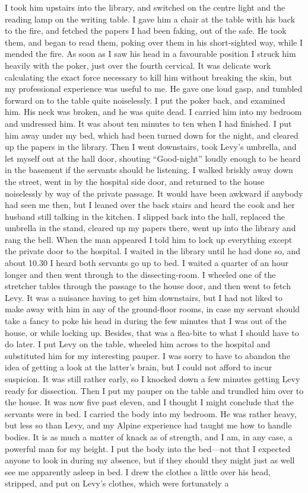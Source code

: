 I took him upstairs into the library, and switched on the centre light and the reading lamp on the writing table. I gave him a chair at the table with his back to the fire, and fetched the papers I had been faking, out of the safe. He took them, and began to read them, poking over them in his short-sighted way, while I mended the fire. As soon as I saw his head in a favourable position I struck him heavily with the poker, just over the fourth cervical. It was delicate work calculating the exact force necessary to kill him without breaking the skin, but my professional experience was useful to me. He gave one loud gasp, and tumbled forward on to the table quite noiselessly. I put the poker back, and examined him. His neck was broken, and he was quite dead. I carried him into my bedroom and undressed him. It was about ten minutes to ten when I had finished. I put him away under my bed, which had been turned down for the night, and cleared up the papers in the library. Then I went downstairs, took Levy’s umbrella, and let myself out at the hall door, shouting \enquote{Good-night} loudly enough to be heard in the basement if the servants should be listening. I walked briskly away down the street, went in by the hospital side door, and returned to the house noiselessly by way of the private passage. It would have been awkward if anybody had seen me then, but I leaned over the back stairs and heard the cook and her husband still talking in the kitchen. I slipped back into the hall, replaced the umbrella in the stand, cleared up my papers there, went up into the library and rang the bell. When the man appeared I told him to lock up everything except the private door to the hospital. I waited in the library until he had done so, and about 10.30 I heard both servants go up to bed. I waited a quarter of an hour longer and then went through to the dissecting-room. I wheeled one of the stretcher tables through the passage to the house door, and then went to fetch Levy. It was a nuisance having to get him downstairs, but I had not liked to make away with him in any of the ground-floor rooms, in case my servant should take a fancy to poke his head in during the few minutes that I was out of the house, or while locking up. Besides, that was a flea-bite to what I should have to do later. I put Levy on the table, wheeled him across to the hospital and substituted him for my interesting pauper. I was sorry to have to abandon the idea of getting a look at the latter’s brain, but I could not afford to incur suspicion. It was still rather early, so I knocked down a few minutes getting Levy ready for dissection. Then I put my pauper on the table and trundled him over to the house. It was now five past eleven, and I thought I might conclude that the servants were in bed. I carried the body into my bedroom. He was rather heavy, but less so than Levy, and my Alpine experience had taught me how to handle bodies. It is as much a matter of knack as of strength, and I am, in any case, a powerful man for my height. I put the body into the bed\allowbreak---\allowbreak not that I expected anyone to look in during my absence, but if they should they might just as well see me apparently asleep in bed. I drew the clothes a little over his head, stripped, and put on Levy’s clothes, which were fortunately a 